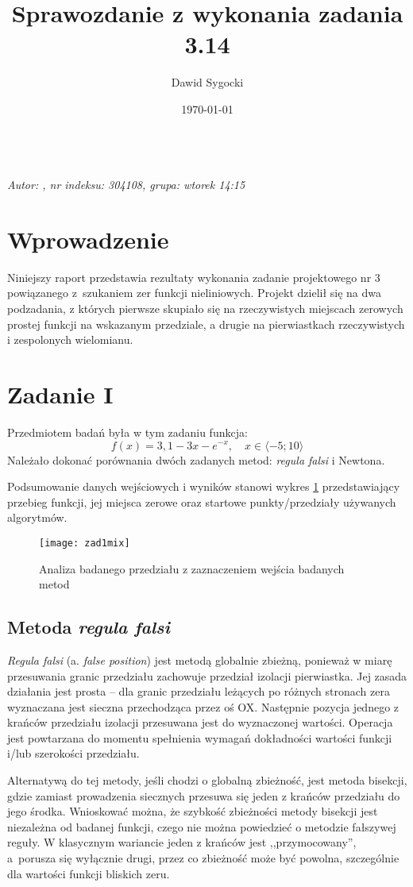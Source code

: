 \documentclass[12pt]{article}
\title{Sprawozdanie z wykonania zadania 3.14}
\author{Dawid Sygocki}
\date{\today}
\begin{document}
\makeatletter
{\huge \@title} \\
\textsl{\large Autor: \@author, nr indeksu: 304108, grupa: wtorek 14:15}
\makeatother

\section{Wprowadzenie}
Niniejszy raport przedstawia rezultaty wykonania zadanie projektowego nr 3 powiązanego z~szukaniem zer funkcji nieliniowych. Projekt dzielił się na dwa podzadania, z których pierwsze skupiało się na rzeczywistych miejscach zerowych prostej funkcji na wskazanym przedziale, a drugie na pierwiastkach rzeczywistych i zespolonych wielomianu.

\section{Zadanie I}
Przedmiotem badań była w tym zadaniu funkcja:
\[ f(x) = 3,1 - 3x - e^{-x}, \quad x \in \langle -5; 10 \rangle \]
Należało dokonać porównania dwóch zadanych metod: \textit{regula falsi} i Newtona.

Podsumowanie danych wejściowych i wyników stanowi wykres \ref{fig:zad1mix} przedstawiający przebieg funkcji, jej miejsca zerowe oraz startowe punkty/przedziały używanych algorytmów.

\begin{figure}[!htbp]
\centering
\texttt{[image: zad1mix]}
\centering
\caption{Analiza badanego przedziału z zaznaczeniem wejścia badanych metod}
\label{fig:zad1mix}
\end{figure}
\FloatBarrier

\subsection{Metoda \textit{regula falsi}}
\textit{Regula falsi} (a. \textit{false position}) jest metodą globalnie zbieżną, ponieważ w miarę przesuwania granic przedziału zachowuje przedział izolacji pierwiastka. Jej zasada działania jest prosta -- dla granic przedziału leżących po różnych stronach zera wyznaczana jest sieczna przechodząca przez oś OX. Następnie pozycja jednego z krańców przedziału izolacji przesuwana jest do wyznaczonej wartości. Operacja jest powtarzana do momentu spełnienia wymagań dokładności wartości funkcji i/lub szerokości przedziału.

Alternatywą do tej metody, jeśli chodzi o globalną zbieżność, jest metoda bisekcji, gdzie zamiast prowadzenia siecznych przesuwa się jeden z krańców przedziału do jego środka. Wnioskować można, że szybkość zbieżności metody bisekcji jest niezależna od badanej funkcji, czego nie można powiedzieć o metodzie fałszywej reguły. W klasycznym wariancie jeden z krańców jest ,,przymocowany'', a~porusza się wyłącznie drugi, przez co zbieżność może być powolna, szczególnie dla wartości funkcji bliskich zeru.
\end{document}
